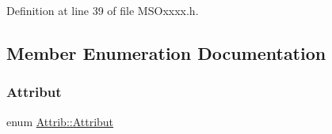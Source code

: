 Definition at line 39 of file M\+S\+Oxxxx.\+h.



\subsection{Member Enumeration Documentation}
\mbox{\label{classAttrib_a69e171d7cc6417835a5a306d3c764235}} 
\subsubsection{\texorpdfstring{Attribut}{Attribut}}
{\footnotesize\ttfamily enum \hyperlink{classAttrib_a69e171d7cc6417835a5a306d3c764235}{Attrib\+::\+Attribut}\hspace{0.3cm}{\ttfamily [inherited]}}

